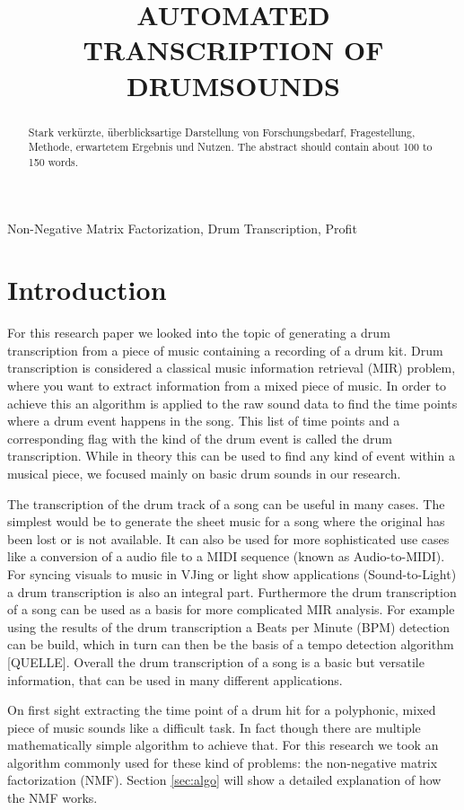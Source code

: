 \documentclass{article}
\title{AUTOMATED TRANSCRIPTION OF DRUMSOUNDS}
\begin{document}
%
\maketitle
%
\begin{abstract}
Stark verkürzte, überblicksartige Darstellung von Forschungsbedarf, Fragestellung, Methode, erwartetem
Ergebnis und Nutzen.
The abstract should contain about 100 to 150 words.
\end{abstract}
%
\begin{keywords}
Non-Negative Matrix Factorization, Drum Transcription, Profit
\end{keywords}
%
\section{Introduction}
\label{sec:intro}

For this research paper we looked into the topic of generating a drum transcription from a piece of music containing a recording of a drum kit.
Drum transcription is considered a classical music information retrieval (MIR) problem, where you want to extract information from a mixed piece of music.
In order to achieve this an algorithm is applied to the raw sound data to find the time points where a drum event happens in the song.
This list of time points and a corresponding flag with the kind of the drum event is called the drum transcription. 
While in theory this can be used to find any kind of event within a musical piece, we focused mainly on basic drum sounds in our research.

The transcription of the drum track of a song can be useful in many cases.
The simplest would be to generate the sheet music for a song where the original has been lost or is not available.
It can also be used for more sophisticated use cases like a conversion of a audio file to a MIDI sequence (known as Audio-to-MIDI).
For syncing visuals to music in VJing or light show applications (Sound-to-Light) a drum transcription is also an integral part.
Furthermore the drum transcription of a song can be used as a basis for more complicated MIR analysis.
For example using the results of the drum transcription a Beats per Minute (BPM) detection can be build, which in turn can then be the basis of a tempo detection algorithm [QUELLE].
Overall the drum transcription of a song is a basic but versatile information, that can be used in many different applications.


On first sight extracting the time point of a drum hit for a polyphonic, mixed piece of music sounds like a difficult task.
In fact though there are multiple mathematically simple algorithm to achieve that.
For this research we took an algorithm commonly used for these kind of problems: the non-negative matrix factorization (NMF).
Section \ref{sec:algo} will show a detailed explanation of how the NMF works.
\end{document}
